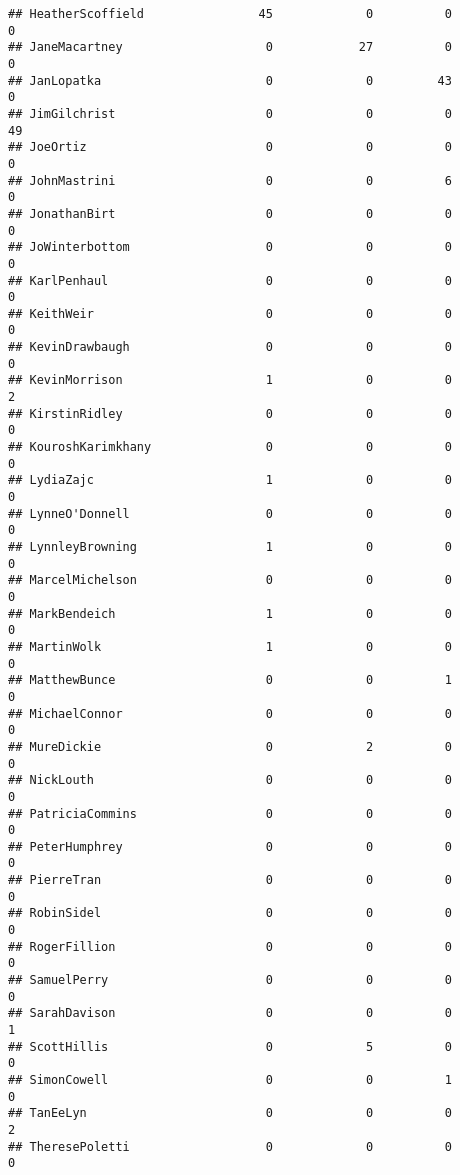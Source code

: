 \documentclass[
  12pt,
]{article}
\begin{document}
\begin{verbatim}
## HeatherScoffield                45             0          0            0
## JaneMacartney                    0            27          0            0
## JanLopatka                       0             0         43            0
## JimGilchrist                     0             0          0           49
## JoeOrtiz                         0             0          0            0
## JohnMastrini                     0             0          6            0
## JonathanBirt                     0             0          0            0
## JoWinterbottom                   0             0          0            0
## KarlPenhaul                      0             0          0            0
## KeithWeir                        0             0          0            0
## KevinDrawbaugh                   0             0          0            0
## KevinMorrison                    1             0          0            2
## KirstinRidley                    0             0          0            0
## KouroshKarimkhany                0             0          0            0
## LydiaZajc                        1             0          0            0
## LynneO'Donnell                   0             0          0            0
## LynnleyBrowning                  1             0          0            0
## MarcelMichelson                  0             0          0            0
## MarkBendeich                     1             0          0            0
## MartinWolk                       1             0          0            0
## MatthewBunce                     0             0          1            0
## MichaelConnor                    0             0          0            0
## MureDickie                       0             2          0            0
## NickLouth                        0             0          0            0
## PatriciaCommins                  0             0          0            0
## PeterHumphrey                    0             0          0            0
## PierreTran                       0             0          0            0
## RobinSidel                       0             0          0            0
## RogerFillion                     0             0          0            0
## SamuelPerry                      0             0          0            0
## SarahDavison                     0             0          0            1
## ScottHillis                      0             5          0            0
## SimonCowell                      0             0          1            0
## TanEeLyn                         0             0          0            2
## TheresePoletti                   0             0          0            0

\end{verbatim}
\end{document}
